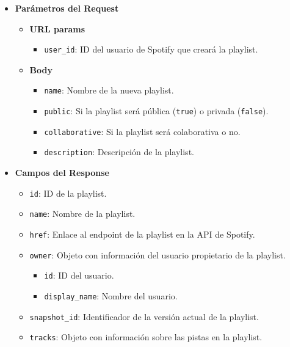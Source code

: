 \begin{itemize}
    \item \textbf{Parámetros del Request}
          \begin{itemize}
              \item \textbf{URL params}
                    \begin{itemize}
                        \item \texttt{user\_id}: ID del usuario de Spotify que creará la playlist.
                    \end{itemize}
              \item \textbf{Body}
                    \begin{itemize}
                        \item \texttt{name}: Nombre de la nueva playlist.
                        \item \texttt{public}: Si la playlist será pública (\texttt{true}) o privada (\texttt{false}).
                        \item \texttt{collaborative}: Si la playlist será colaborativa o no.
                        \item \texttt{description}: Descripción de la playlist.
                    \end{itemize}
          \end{itemize}
    \item \textbf{Campos del Response}
          \begin{itemize}
              \item \texttt{id}: ID de la playlist.
              \item \texttt{name}: Nombre de la playlist.
              \item \texttt{href}: Enlace al endpoint de la playlist en la API de Spotify.
              \item \texttt{owner}: Objeto con información del usuario propietario de la playlist.
                    \begin{itemize}
                        \item \texttt{id}: ID del usuario.
                        \item \texttt{display\_name}: Nombre del usuario.
                    \end{itemize}
              \item \texttt{snapshot\_id}: Identificador de la versión actual de la playlist.
              \item \texttt{tracks}: Objeto con información sobre las pistas en la playlist.
          \end{itemize}
\end{itemize}

